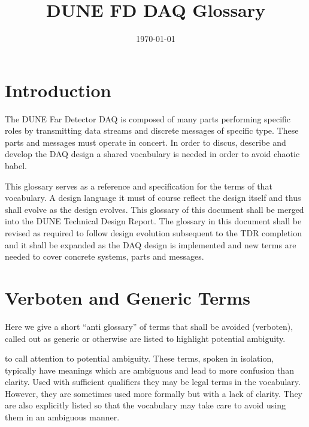 \documentclass[letterpaper,article,oneside]{memoir}
\title{DUNE FD DAQ Glossary}
\date{\today}
\begin{document}
\maketitle

\tableofcontents*

\section{Introduction}
\label{sec:intro}

The DUNE Far Detector DAQ is composed of many parts performing
specific roles by transmitting data streams and discrete messages of
specific type. 
These parts and messages must operate in concert. 
In order to discus, describe and develop the DAQ design a shared
vocabulary is needed in order to avoid chaotic babel.

This glossary serves as a reference and specification for the terms of
that vocabulary.
A design language it must of course reflect the design itself and thus
shall evolve as the design evolves. 
This glossary of this document shall be merged into the DUNE Technical
Design Report. 
The glossary in this document shall be revised as required to follow
design evolution subsequent to the TDR completion and it shall be
expanded as the DAQ design is implemented and new terms are needed to
cover concrete systems, parts and messages.

\section{Verboten and Generic Terms}

Here we give a short ``anti glossary'' of terms that shall be avoided
(verboten), called out as generic or otherwise are listed to highlight
potential ambiguity.

to call
attention to potential ambiguity.
These terms, spoken in isolation, typically have meanings which are
ambiguous and lead to more confusion than clarity. 
Used with sufficient qualifiers they may be legal terms in the
vocabulary.
However, they are sometimes used more formally but with a lack of
clarity. 
They are also explicitly listed so that the vocabulary may take care
to avoid using them in an ambiguous manner.
\end{document}
